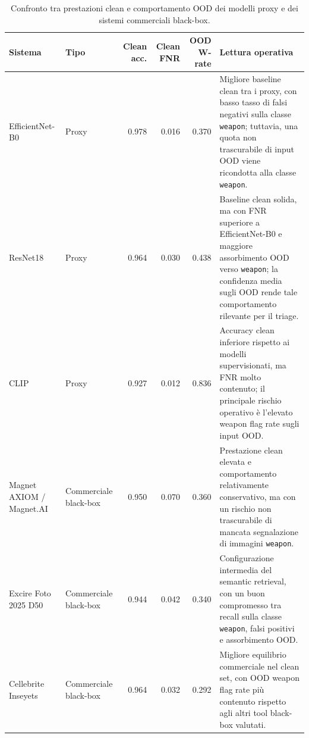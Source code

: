 \begin{table}[H]
\centering
\caption{Confronto tra prestazioni clean e comportamento OOD dei modelli proxy e dei sistemi commerciali black-box.}
\label{tab:results-comparative-clean-ood}
\small
\renewcommand{\arraystretch}{1.18}
\setlength{\tabcolsep}{3pt}
\begin{tabularx}{\textwidth}{@{}p{2.65cm} p{1.75cm} r r r X@{}}
\toprule
\textbf{Sistema} &
\textbf{Tipo} &
\textbf{Clean acc.} &
\textbf{Clean FNR} &
\textbf{OOD W-rate} &
\textbf{Lettura operativa} \\
\midrule

EfficientNet-B0 &
Proxy &
0.978 &
0.016 &
0.370 &
Migliore baseline clean tra i proxy, con basso tasso di falsi negativi sulla
classe \texttt{weapon}; tuttavia, una quota non trascurabile di input OOD viene
ricondotta alla classe \texttt{weapon}. \\

ResNet18 &
Proxy &
0.964 &
0.030 &
0.438 &
Baseline clean solida, ma con FNR superiore a EfficientNet-B0 e maggiore
assorbimento OOD verso \texttt{weapon}; la confidenza media sugli OOD rende tale
comportamento rilevante per il triage. \\

CLIP &
Proxy &
0.927 &
0.012 &
0.836 &
Accuracy clean inferiore rispetto ai modelli supervisionati, ma FNR molto
contenuto; il principale rischio operativo è l'elevato weapon flag rate sugli
input OOD. \\

Magnet AXIOM / Magnet.AI &
Commerciale black-box &
0.950 &
0.070 &
0.360 &
Prestazione clean elevata e comportamento relativamente conservativo, ma con un
rischio non trascurabile di mancata segnalazione di immagini \texttt{weapon}. \\

Excire Foto 2025 D50 &
Commerciale black-box &
0.944 &
0.042 &
0.340 &
Configurazione intermedia del semantic retrieval, con un buon compromesso tra
recall sulla classe \texttt{weapon}, falsi positivi e assorbimento OOD. \\

Cellebrite Inseyets &
Commerciale black-box &
0.964 &
0.032 &
0.292 &
Migliore equilibrio commerciale nel clean set, con OOD weapon flag rate più
contenuto rispetto agli altri tool black-box valutati. \\

\bottomrule
\end{tabularx}
\end{table}

